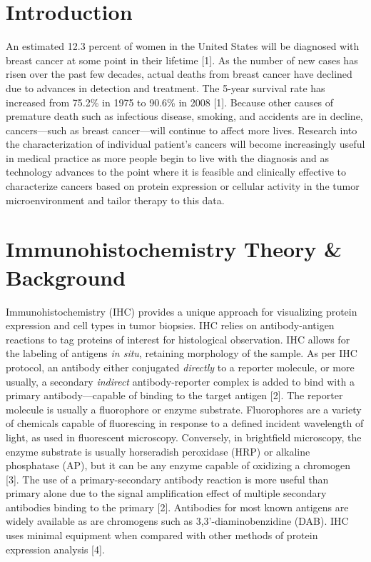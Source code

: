 \documentclass[12pt]{article}
\begin{document}
\break
\section*{Introduction}

An estimated 12.3 percent of women in the United States will be diagnosed with breast cancer at some point in their lifetime [1]. As the number of new cases has risen over the past few decades, actual deaths from breast cancer have declined due to advances in detection and treatment. The 5-year survival rate has increased from 75.2\% in 1975 to 90.6\% in 2008 [1]. Because other causes of premature death such as infectious disease, smoking, and accidents are in decline, cancers—such as breast cancer—will continue to affect more lives. Research into the characterization of individual patient’s cancers will become increasingly useful in medical practice as more people begin to live with the diagnosis and as technology advances to the point where it is feasible and clinically effective to characterize cancers based on protein expression or cellular activity in the tumor microenvironment and tailor therapy to this data.


\section*{Immunohistochemistry Theory \& Background}

Immunohistochemistry (IHC) provides a unique approach for visualizing protein expression and cell types in tumor biopsies. IHC relies on antibody-antigen reactions to tag proteins of interest for histological observation. IHC allows for the labeling of antigens \textit{in situ}, retaining morphology of the sample. As per IHC protocol, an antibody either conjugated \textit{directly} to a reporter molecule, or more usually, a secondary \textit{indirect} antibody-reporter complex is added to bind with a primary antibody---capable of binding to the target antigen [2]. The reporter molecule is usually a fluorophore or enzyme substrate. Fluorophores are a variety of chemicals capable of fluorescing in response to a defined incident wavelength of light, as used in fluorescent microscopy. Conversely, in brightfield microscopy, the enzyme substrate is usually horseradish peroxidase (HRP) or alkaline phosphatase (AP), but it can be any enzyme capable of oxidizing a chromogen [3]. The use of a primary-secondary antibody reaction is more useful than primary alone due to the signal amplification effect of multiple secondary antibodies binding to the primary [2]. Antibodies for most known antigens are widely available as are chromogens such as 3,3'-diaminobenzidine (DAB). IHC uses minimal equipment when compared with other methods of protein expression analysis [4]. 
\end{document}
